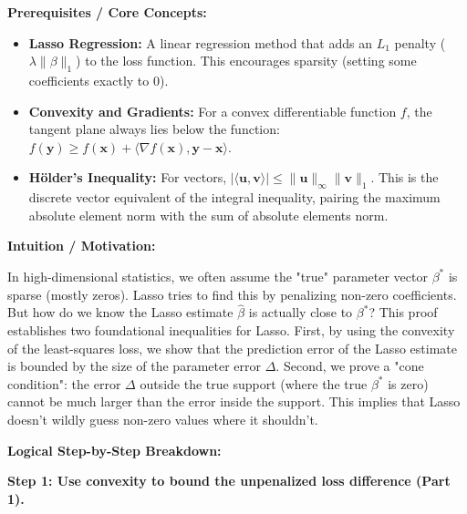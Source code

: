 \begin{solution}
\textbf{Prerequisites / Core Concepts:}
\begin{itemize}
    \item \textbf{Lasso Regression:} A linear regression method that adds an $L_1$ penalty ($\lambda \|\beta\|_1$) to the loss function. This encourages sparsity (setting some coefficients exactly to 0).
    \item \textbf{Convexity and Gradients:} For a convex differentiable function $f$, the tangent plane always lies below the function: $f(\mathbf{y}) \geq f(\mathbf{x}) + \langle \nabla f(\mathbf{x}), \mathbf{y} - \mathbf{x} \rangle$.
    \item \textbf{Hölder's Inequality:} For vectors, $|\langle \mathbf{u}, \mathbf{v} \rangle| \leq \|\mathbf{u}\|_\infty \|\mathbf{v}\|_1$. This is the discrete vector equivalent of the integral inequality, pairing the maximum absolute element norm with the sum of absolute elements norm.
\end{itemize}

\textbf{Intuition / Motivation:}

In high-dimensional statistics, we often assume the "true" parameter vector $\beta^*$ is sparse (mostly zeros). Lasso tries to find this by penalizing non-zero coefficients. But how do we know the Lasso estimate $\widehat{\beta}$ is actually close to $\beta^*$? This proof establishes two foundational inequalities for Lasso. First, by using the convexity of the least-squares loss, we show that the prediction error of the Lasso estimate is bounded by the size of the parameter error $\Delta$. Second, we prove a "cone condition": the error $\Delta$ outside the true support (where the true $\beta^*$ is zero) cannot be much larger than the error inside the support. This implies that Lasso doesn't wildly guess non-zero values where it shouldn't.

\textbf{Logical Step-by-Step Breakdown:}

\textbf{Step 1: Use convexity to bound the unpenalized loss difference (Part 1).}


\end{solution}
